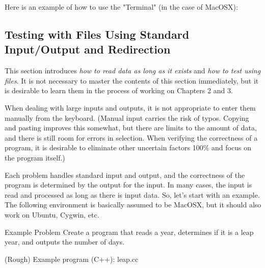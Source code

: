 Here is an example of how to use the "Terminal" (in the case of MacOSX):

\subsection{Testing with Files Using Standard Input/Output and Redirection}

This section introduces \textit{how to read data as long as it exists} and \textit{how to test using files}.
It is not necessary to master the contents of this section immediately, but it is desirable to learn them in the process of working on Chapters 2 and 3.

When dealing with large inputs and outputs, it is not appropriate to enter them manually from the keyboard.
(Manual input carries the risk of typos. Copying and pasting improves this somewhat, but there are limits to the amount of data, and there is still room for errors in selection. When verifying the correctness of a program, it is desirable to eliminate other uncertain factors 100\% and focus on the program itself.)

Each problem handles standard input and output, and the correctness of the program is determined by the output for the input. In many cases, the input is read and processed as long as there is input data.
So, let's start with an example. The following environment is basically assumed to be MacOSX, but it should also work on Ubuntu, Cygwin, etc.

\begin{itembox}[l]{Example Problem}
Create a program that reads a year, determines if it is a leap year, and outputs the number of days.
\end{itembox}

(Rough) Example program (C++): leap.cc

%
%
%
%

